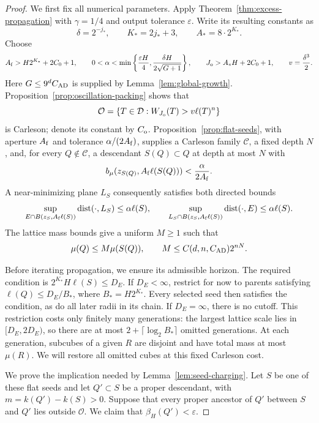 \begin{proof}
We first fix all numerical parameters.  Apply
Theorem~\ref{thm:excess-propagation} with $\gamma=1/4$ and output
tolerance $\varepsilon$.  Write its resulting constants as
\[
 \delta=2^{-j_*},\qquad K_*=2j_*+3,\qquad A_*=8\cdot2^{K_*}.
\]
Choose
\[
 A_{\rm f}>H2^{K_*}+2C_0+1,\qquad
 0<\alpha<\min\left\{\frac{\varepsilon H}{4},
                  \frac{\delta H}{2\sqrt{G+1}}\right\},
 \qquad J_{\rm o}>A_*H+2C_0+1,
 \qquad v=\frac{\delta^3}{2}.
\]
Here $G\leq9^dC_{\rm AD}$ is supplied by
Lemma~\ref{lem:global-growth}.  Proposition~\ref{prop:oscillation-packing}
shows that
\[
 \mathcal O=\{T\in\mathcal D:
                  W_{J_{\rm o}}(T)>v\ell(T)^n\}
\]
is Carleson; denote its constant by $C_{\rm o}$.
Proposition~\ref{prop:flat-seeds}, with aperture $A_{\rm f}$ and
tolerance $\alpha/(2A_{\rm f})$, supplies a Carleson family
$\mathcal C$, a fixed depth $N$, and, for every $Q\notin\mathcal C$,
a descendant $S(Q)\subset Q$ at depth at most $N$ with
\[
 b_\mu(z_{S(Q)},A_{\rm f}\ell(S(Q)))
       <\frac{\alpha}{2A_{\rm f}}.
\]
A near-minimizing plane $L_S$ consequently satisfies both directed
bounds
\begin{equation}\label{eq:seed-plane-bounds}
 \sup_{E\cap B(z_S,A_{\rm f}\ell(S))}\operatorname{dist}(\cdot,L_S)
 \leq\alpha\ell(S),\qquad
 \sup_{L_S\cap B(z_S,A_{\rm f}\ell(S))}\operatorname{dist}(\cdot,E)
 \leq\alpha\ell(S).
\end{equation}
The lattice mass bounds give a uniform $M\geq1$ such that
\begin{equation}\label{eq:seed-mass-comparison}
 \mu(Q)\leq M\mu(S(Q)),\qquad
 M\leq C(d,n,C_{\rm AD})2^{nN}.
\end{equation}

Before iterating propagation, we ensure its admissible horizon.
The required condition is
$2^{K_*}H\ell(S)\leq D_E$. If $D_E<\infty$, restrict for now to
parents satisfying $\ell(Q)\leq D_E/B_*$, where
$B_*=H2^{K_*}$. Every selected seed then satisfies the condition,
as do all later radii in its chain. If $D_E=\infty$, there is no cutoff.
This restriction costs only finitely many generations:
the largest lattice scale lies in $[D_E,2D_E)$, so there are at most
$2+\lceil\log_2 B_*\rceil$ omitted generations. At each generation,
subcubes of a given $R$ are disjoint and have total mass at most $\mu(R)$.
We will restore all omitted cubes at this fixed Carleson cost.

We prove the implication needed by Lemma~\ref{lem:seed-charging}.
Let $S$ be one of these flat seeds and let $Q'\subset S$ be a proper
descendant, with
$m=k(Q')-k(S)>0$.  Suppose that every proper ancestor of $Q'$ between
$S$ and $Q'$ lies outside $\mathcal O$.  We claim that
$\beta_H(Q')<\varepsilon$.


\end{proof}
